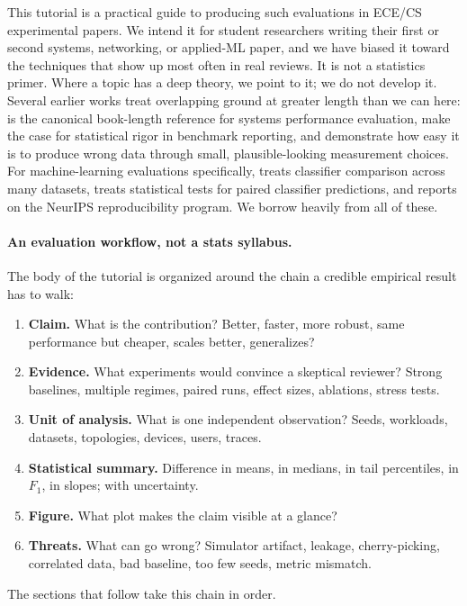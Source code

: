 \documentclass[11pt]{article}
\begin{document}
This tutorial is a practical guide to producing such evaluations in ECE/CS experimental papers. We intend it for student researchers writing their first or second systems, networking, or applied-ML paper, and we have biased it toward the techniques that show up most often in real reviews. It is not a statistics primer. Where a topic has a deep theory, we point to it; we do not develop it. Several earlier works treat overlapping ground at greater length than we can here: \citet{jain1991art} is the canonical book-length reference for systems performance evaluation, \citet{georges2007rigorous} make the case for statistical rigor in benchmark reporting, and \citet{mytkowicz2009wrong} demonstrate how easy it is to produce wrong data through small, plausible-looking measurement choices. For machine-learning evaluations specifically, \citet{demsar2006statistical} treats classifier comparison across many datasets, \citet{dietterich1998approximate} treats statistical tests for paired classifier predictions, and \citet{pineau2021reproducibility} reports on the NeurIPS reproducibility program. We borrow heavily from all of these.

\paragraph{An evaluation workflow, not a stats syllabus.} The body of the tutorial is organized around the chain a credible empirical result has to walk:
\begin{enumerate}[leftmargin=*, itemsep=1pt]
    \item \textbf{Claim.} What is the contribution? Better, faster, more robust, same performance but cheaper, scales better, generalizes?
    \item \textbf{Evidence.} What experiments would convince a skeptical reviewer? Strong baselines, multiple regimes, paired runs, effect sizes, ablations, stress tests.
    \item \textbf{Unit of analysis.} What is one independent observation? Seeds, workloads, datasets, topologies, devices, users, traces.
    \item \textbf{Statistical summary.} Difference in means, in medians, in tail percentiles, in $F_1$, in slopes; with uncertainty.
    \item \textbf{Figure.} What plot makes the claim visible at a glance?
    \item \textbf{Threats.} What can go wrong? Simulator artifact, leakage, cherry-picking, correlated data, bad baseline, too few seeds, metric mismatch.
\end{enumerate}
The sections that follow take this chain in order.
\end{document}
